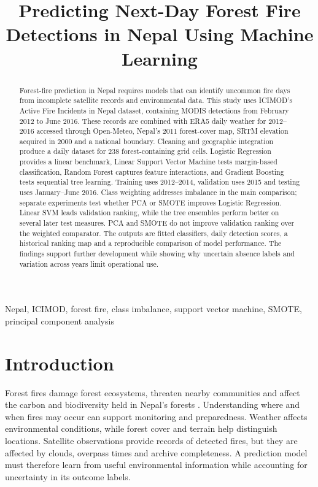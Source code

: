 \documentclass[conference,a4paper]{IEEEtran}
\title{Predicting Next-Day Forest Fire Detections in Nepal Using Machine Learning}
\author{\IEEEauthorblockN{Krijal Shrestha}\IEEEauthorblockA{Coventry ID: 11495103\\STW7072CEM Machine Learning\\Softwarica College of IT and E-commerce, Coventry University}}
\begin{document}
\maketitle
\begin{abstract}
Forest-fire prediction in Nepal requires models that can identify uncommon fire days from incomplete satellite records and environmental data. This study uses ICIMOD's Active Fire Incidents in Nepal dataset, containing MODIS detections from February 2012 to June 2016. These records are combined with ERA5 daily weather for 2012--2016 accessed through Open-Meteo, Nepal's 2011 forest-cover map, SRTM elevation acquired in 2000 and a national boundary. Cleaning and geographic integration produce a daily dataset for 238 forest-containing grid cells. Logistic Regression provides a linear benchmark, Linear Support Vector Machine tests margin-based classification, Random Forest captures feature interactions, and Gradient Boosting tests sequential tree learning. Training uses 2012--2014, validation uses 2015 and testing uses January--June 2016. Class weighting addresses imbalance in the main comparison; separate experiments test whether PCA or SMOTE improves Logistic Regression. Linear SVM leads validation ranking, while the tree ensembles perform better on several later test measures. PCA and SMOTE do not improve validation ranking over the weighted comparator. The outputs are fitted classifiers, daily detection scores, a historical ranking map and a reproducible comparison of model performance. The findings support further development while showing why uncertain absence labels and variation across years limit operational use.

\end{abstract}
\begin{IEEEkeywords}
Nepal, ICIMOD, forest fire, class imbalance, support vector machine, SMOTE, principal component analysis
\end{IEEEkeywords}

\section{Introduction}
Forest fires damage forest ecosystems, threaten nearby communities and affect the carbon and biodiversity held in Nepal's forests \citep{dahal}. Understanding where and when fires may occur can support monitoring and preparedness. Weather affects environmental conditions, while forest cover and terrain help distinguish locations. Satellite observations provide records of detected fires, but they are affected by clouds, overpass times and archive completeness. A prediction model must therefore learn from useful environmental information while accounting for uncertainty in its outcome labels.
\end{document}
